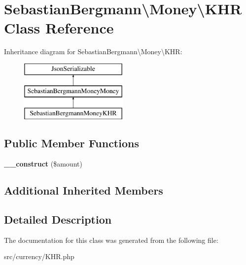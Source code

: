 \hypertarget{classSebastianBergmann_1_1Money_1_1KHR}{}\section{Sebastian\+Bergmann\textbackslash{}Money\textbackslash{}K\+H\+R Class Reference}
\label{classSebastianBergmann_1_1Money_1_1KHR}
Inheritance diagram for Sebastian\+Bergmann\textbackslash{}Money\textbackslash{}K\+H\+R\+:\begin{figure}[H]
\begin{center}
\leavevmode
\includegraphics[height=3.000000cm]{classSebastianBergmann_1_1Money_1_1KHR}
\end{center}
\end{figure}
\subsection*{Public Member Functions}
\begin{DoxyCompactItemize}
\item 
\hypertarget{classSebastianBergmann_1_1Money_1_1KHR_ae912162841834b0b415d1b4712386429}{}{\bfseries \+\_\+\+\_\+construct} (\$amount)\label{classSebastianBergmann_1_1Money_1_1KHR_ae912162841834b0b415d1b4712386429}

\end{DoxyCompactItemize}
\subsection*{Additional Inherited Members}


\subsection{Detailed Description}


The documentation for this class was generated from the following file\+:\begin{DoxyCompactItemize}
\item 
src/currency/K\+H\+R.\+php\end{DoxyCompactItemize}
